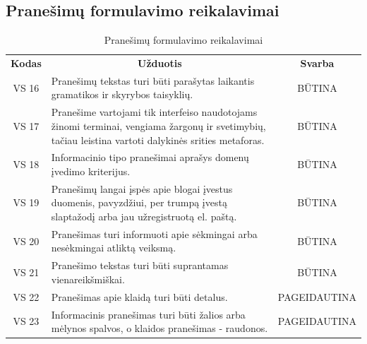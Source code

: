 \documentclass{VUMIFPSkursinis}
\begin{document}
\subsection{Pranešimų formulavimo reikalavimai}
\begin{center}
	\begin{table}[H]
	\caption{Pranešimų formulavimo reikalavimai}
	\begin{tabular}{|p{2cm}|p{11cm}|p{2cm}|}
	\hline
	    \rowcolor{lightgray}
	    \multicolumn{3}{|c|}{Pranešimų formulavimo reikalavimai}\\
	\hline
		\multicolumn{1}{|c|}{{\bfseries Kodas}}&
		\multicolumn{1}{|c|}{ {\bfseries Užduotis}}&
		\multicolumn{1}{|c|}{{\bfseries Svarba}}\\		
	\hline
		\multicolumn{1}{|c|}{VS 16}&
		\multicolumn{1}{|p{12,6cm}|}{Pranešimų tekstas turi būti parašytas laikantis gramatikos ir skyrybos taisyklių.}& 
		\multicolumn{1}{|c|}{BŪTINA}\\
	\hline
		\multicolumn{1}{|c|}{VS 17}&
		\multicolumn{1}{|p{12,5cm}|}{Pranešime vartojami tik interfeiso naudotojams žinomi terminai, vengiama žargonų ir svetimybių, tačiau leistina vartoti dalykinės srities metaforas.}& 
		\multicolumn{1}{|c|}{BŪTINA}\\
	\hline
		\multicolumn{1}{|c|}{VS 18}&
		\multicolumn{1}{|p{12,5cm}|}{Informacinio tipo pranešimai aprašys domenų įvedimo kriterijus.}& 
		\multicolumn{1}{|c|}{BŪTINA}\\
	\hline
		\multicolumn{1}{|c|}{VS 19}&
		\multicolumn{1}{|p{12,5cm}|}{Pranešimų langai įspės apie blogai įvestus duomenis, pavyzdžiui, per trumpą įvestą slaptažodį arba jau užregistruotą el. paštą.}& 
		\multicolumn{1}{|c|}{BŪTINA}\\
	\hline
		\multicolumn{1}{|c|}{VS 20}&
		\multicolumn{1}{|p{12,5cm}|}{Pranešimas turi informuoti apie sėkmingai arba nesėkmingai atliktą veiksmą.}& 
		\multicolumn{1}{|c|}{BŪTINA}\\
	\hline
		\multicolumn{1}{|c|}{VS 21}&
		\multicolumn{1}{|p{12,5cm}|}{Pranešimo tekstas turi būti suprantamas vienareikšmiškai.}& 
		\multicolumn{1}{|c|}{BŪTINA}\\
	\hline
		\multicolumn{1}{|c|}{VS 22}&
		\multicolumn{1}{|p{12,5cm}|}{Pranešimas apie klaidą turi būti detalus.}& 
		\multicolumn{1}{|p{1.5cm}|}{PAGEIDAUTINA}\\
	\hline
		\multicolumn{1}{|c|}{VS 23}&
		\multicolumn{1}{|p{12,5cm}|}{Informacinis pranešimas turi būti žalios arba mėlynos spalvos, o klaidos pranešimas - raudonos.}& 
		\multicolumn{1}{|p{1.5cm}|}{PAGEIDAUTINA}\\

\end{tabular}
\end{table}
\end{center}
\end{document}
